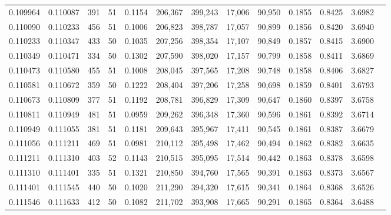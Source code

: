 \begin{tabular}{rrrrrrrrrrrrr}
0.109964 & 0.110087 &   391 &  51 &                                     0.1154 & 206,367 & 399,243 &  17,006 &  90,950 & 0.1855 & 0.8425 & 3.6982 \\
0.110090 & 0.110233 &   456 &  51 &                                     0.1006 & 206,823 & 398,787 &  17,057 &  90,899 & 0.1856 & 0.8420 & 3.6940 \\
0.110233 & 0.110347 &   433 &  50 &                                     0.1035 & 207,256 & 398,354 &  17,107 &  90,849 & 0.1857 & 0.8415 & 3.6900 \\
0.110349 & 0.110471 &   334 &  50 &                                     0.1302 & 207,590 & 398,020 &  17,157 &  90,799 & 0.1858 & 0.8411 & 3.6869 \\
0.110473 & 0.110580 &   455 &  51 &                                     0.1008 & 208,045 & 397,565 &  17,208 &  90,748 & 0.1858 & 0.8406 & 3.6827 \\
0.110581 & 0.110672 &   359 &  50 &                                     0.1222 & 208,404 & 397,206 &  17,258 &  90,698 & 0.1859 & 0.8401 & 3.6793 \\
0.110673 & 0.110809 &   377 &  51 &                                     0.1192 & 208,781 & 396,829 &  17,309 &  90,647 & 0.1860 & 0.8397 & 3.6758 \\
0.110811 & 0.110949 &   481 &  51 &                                     0.0959 & 209,262 & 396,348 &  17,360 &  90,596 & 0.1861 & 0.8392 & 3.6714 \\
0.110949 & 0.111055 &   381 &  51 &                                     0.1181 & 209,643 & 395,967 &  17,411 &  90,545 & 0.1861 & 0.8387 & 3.6679 \\
0.111056 & 0.111211 &   469 &  51 &                                     0.0981 & 210,112 & 395,498 &  17,462 &  90,494 & 0.1862 & 0.8382 & 3.6635 \\
0.111211 & 0.111310 &   403 &  52 &                                     0.1143 & 210,515 & 395,095 &  17,514 &  90,442 & 0.1863 & 0.8378 & 3.6598 \\
0.111310 & 0.111401 &   335 &  51 &                                     0.1321 & 210,850 & 394,760 &  17,565 &  90,391 & 0.1863 & 0.8373 & 3.6567 \\
0.111401 & 0.111545 &   440 &  50 &                                     0.1020 & 211,290 & 394,320 &  17,615 &  90,341 & 0.1864 & 0.8368 & 3.6526 \\
0.111546 & 0.111633 &   412 &  50 &                                     0.1082 & 211,702 & 393,908 &  17,665 &  90,291 & 0.1865 & 0.8364 & 3.6488 \\

\end{tabular}
